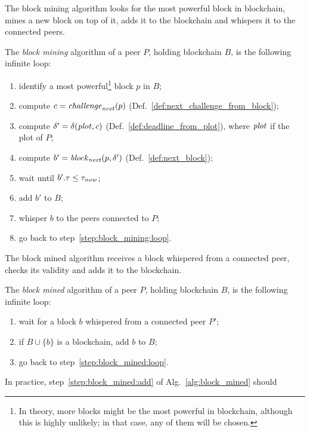 The block mining algorithm looks for the most powerful block in blockchain,
mines a new block on top of it, adds it to the blockchain and whispers it to the connected peers.
%
\begin{alg}\label{alg:block_mining}
  The \emph{block mining} algorithm of a peer $P$, holding blockchain $B$,
  is the following infinite loop:
  \begin{enumerate}
  \item\label{step:block_mining:loop} identify a most powerful\footnote{In theory, more blocks might be the most powerful in blockchain, although this is highly unlikely; in that case, any of them will be chosen.} block $p$ in $B$;
  \item\label{step:block_mining:next_challenge} compute $c={\mathit{challenge}}_{\mathit{next}}(p)$ (Def.~\ref{def:next_challenge_from_block});
  \item\label{step:block_mining:next_deadline} compute $\delta'=\delta({\mathit{plot}},c)$ (Def.~\ref{def:deadline_from_plot}), where ${\mathit{plot}}$
    if the plot of $P$;
  \item\label{step:block_mining:next_block} compute $b'={\mathit{block}}_{\mathit{next}}(p,\delta')$ (Def.~\ref{def:next_block});
  \item\label{step:block_mining:wait} wait until $b'.\tau\le\tau_{\mathit{now}}$;
  \item\label{step:block_mining:add} add $b'$ to $B$;
  \item whisper $b$ to the peers connected to $P$;
  \item go back to step~\ref{step:block_mining:loop}.
  \end{enumerate}
\end{alg}
%
The block mined algorithm receives a block whispered from a connected peer, checks its validity
and adds it to the blockchain.
%
\begin{alg}\label{alg:block_mined}
  The \emph{block mined} algorithm of a peer $P$, holding blockchain $B$,
  is the following infinite loop:
  \begin{enumerate}
  \item\label{step:block_mined:loop} wait for a block $b$ whispered from a connected peer $P'$;
  \item\label{step:block_mined:add} if $B\cup\{b\}$ is a blockchain, add $b$ to $B$;
  \item go back to step~\ref{step:block_mined:loop}.
  \end{enumerate}
\end{alg}
%
In practice, step~\ref{step:block_mined:add} of Alg.~\ref{alg:block_mined} should

